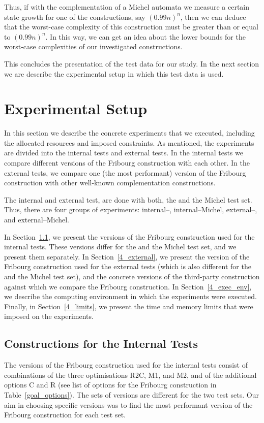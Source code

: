 Thus, if with the complementation of a Michel automata we measure a certain state growth for one of the constructions, say $(0.99n)^n$, then we can deduce that the worst-case complexity of this construction must be greater than or equal to $(0.99n)^n$. In this way, we can get an idea about the lower bounds for the worst-case complexities of our investigated constructions.

This concludes the presentation of the test data for our study. In the next section we are describe the experimental setup in which this test data is used.


\section{Experimental Setup}
\label{4_exp_setup}
In this section we describe the concrete experiments that we executed, including the allocated resources and imposed constraints. As mentioned, the experiments are divided into the internal tests and external tests. In the internal tests we compare different versions of the Fribourg construction with each other. In the external tests, we compare one (the most performant) version of the Fribourg construction with other well-known complementation constructions.

The internal and external test, are done with both, the \goal{} and the Michel test set. Thus, there are four groups of experiments: internal--\goal, internal--Michel, external--\goal, and external--Michel.

In Section~\ref{4_internal}, we present the versions of the Fribourg construction used for the internal tests. These versions differ for the \goal and the Michel test set, and we present them separately. In Section~\ref{4_external}, we present the version of the Fribourg construction used for the external tests (which is also different for the \goal and the Michel test set), and the concrete versions of the third-party construction against which we compare the Fribourg construction. In Section~\ref{4_exec_env}, we describe the computing environment in which the experiments were executed. Finally, in Section~\ref{4_limits}, we present the time and memory limits that were imposed on the experiments. 

\subsection{Constructions for the Internal Tests}
\label{4_internal}
The versions of the Fribourg construction used for the internal tests consist of combinations of the three optimisations R2C, M1, and M2, and of the additional options C and R (see list of options for the Fribourg construction in Table~\ref{goal_options}). The sets of versions are different for the two test sets. Our aim in choosing specific versions was to find the most performant version of the Fribourg construction for each test set.

